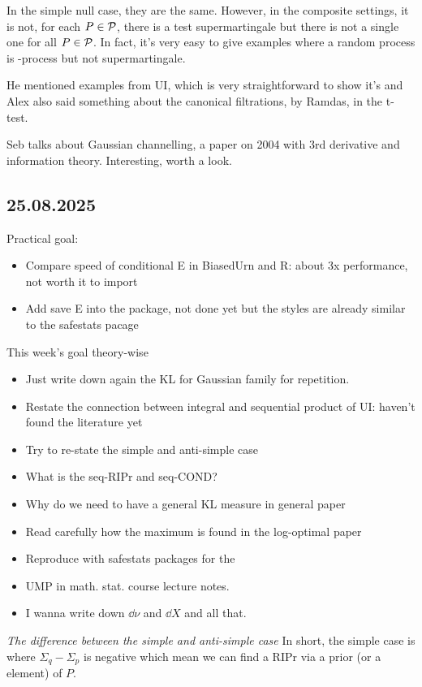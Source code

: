 In the simple null case, they are the same. However, in the composite settings,
it is not, for each $P\in\mathcal{P}$, there is a test supermartingale but
there is not a single one for all $P\in\mathcal{P}$.
In fact, it's very easy to give examples where a random process is \E-process 
but not supermartingale.

He mentioned examples from UI, which is very straightforward to show it's \E 
and Alex also said something about the canonical filtrations, by Ramdas, in
the t-test.

Seb talks about Gaussian channelling, a paper on 2004 with 3rd derivative 
and information theory. Interesting, worth a look.

\subsection*{25.08.2025}
Practical goal:
\begin{itemize}
	\item Compare speed of conditional E in BiasedUrn and R: about 3x performance, not worth it to import
	\item Add save E into the package, not done yet but the styles are already similar to the safestats
	      pacage
\end{itemize}

This week's goal theory-wise
\begin{itemize}
	\item Just write down again the KL for Gaussian family for repetition.
	\item Restate the connection between integral and sequential product of UI:
	      haven't found the literature yet
	\item Try to re-state the simple and anti-simple case
	\item What is the seq-RIPr and seq-COND?
	\item Why do we need to have a general KL measure in general paper
	\item Read carefully how the maximum is found in the log-optimal paper
	\item Reproduce with safestats packages for the
	\item UMP in math. stat. course lecture notes.
	\item I wanna write down $\dd{\nu}$ and $\dd{X}$ and all that.
\end{itemize}

\emph{The difference between the simple and anti-simple case} In short, the simple case
is where $\Sigma_q-\Sigma_p$ is negative which mean we can find a RIPr via a prior (or a element)
of $P$.

